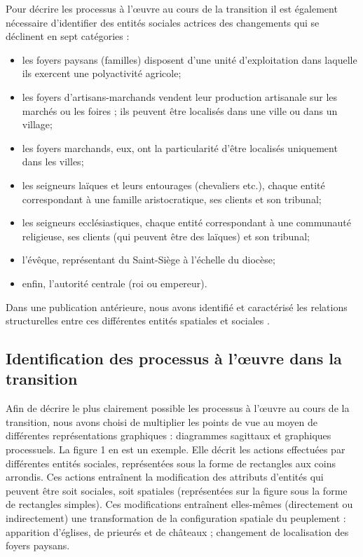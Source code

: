 \documentclass[12pt, a4paper, oneside]{book}
\begin{document}
	Pour décrire les processus à l'œuvre au cours de la transition il est également nécessaire d'identifier des entités sociales actrices des changements qui
	se déclinent en sept catégories :
	\begin{itemize}
		\item les foyers paysans (familles) disposent d'une unité d'exploitation dans	laquelle ils exercent une polyactivité agricole;
		
		\item les foyers d'artisans-marchands vendent leur production artisanale sur les marchés ou les foires ; ils peuvent être localisés dans une ville ou dans un village;
		
		\item les foyers marchands, eux, ont la particularité d'être localisés uniquement dans les villes;
		
		\item les seigneurs laïques et leurs entourages (chevaliers etc.), chaque entité correspondant à une famille aristocratique, ses clients et son tribunal;
		
		\item les seigneurs ecclésiastiques, chaque entité correspondant à une communauté religieuse, ses clients (qui peuvent être des laïques) et son tribunal;		
		
		\item l'évêque, représentant du Saint-Siège à l'échelle du diocèse;
		
		\item enfin, l'autorité centrale (roi ou empereur).
	\end{itemize}
	
	Dans une publication antérieure, nous avons identifié et caractérisé les relations structurelles entre ces différentes entités spatiales et sociales \autocite[figure 13.1, p. 295]{tannier_ontologie_2014}.
	
	\subsection{Identification des processus à l'œuvre dans la transition}
	
	Afin de décrire le plus clairement possible les processus à l'œuvre au cours de la transition, nous avons choisi de multiplier les points de vue au moyen de	différentes représentations graphiques : diagrammes sagittaux et graphiques	processuels.
	La figure 1 en est un exemple.
	Elle décrit les actions effectuées par différentes entités sociales, représentées sous la forme de rectangles aux coins arrondis.
	Ces actions entraînent la modification des attributs d'entités qui peuvent être soit sociales, soit spatiales (représentées sur la figure sous la forme de rectangles simples).
	Ces modifications entraînent elles-mêmes (directement ou indirectement) une transformation de la configuration spatiale du peuplement : apparition d'églises, de prieurés et de châteaux ; changement de localisation des foyers paysans.
	
\end{document}
